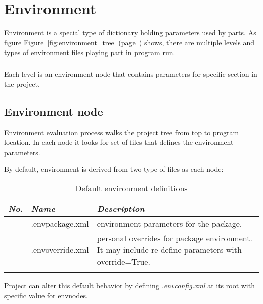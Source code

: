 \documentclass[design.tex]{subfiles}
\begin{document}
\chapter{Environment}
Environment is a special type of dictionary holding parameters used by parts. As figure Figure~\ref{fig:environment_tree} (page~\pageref{fig:environment_tree}) shows, there are multiple levels and types of environment files playing part in program run.
\paragraph{}
Each level is an environment node that contains parameters for specific section in the project.

\section{Environment node}
Environment evaluation process walks the project tree from top to program location. In each node it looks for set of files that defines the environment parameters.

By default, environment is derived from two type of files as each node:


\setcounter{tablerownumbers}{0}
\begin{longtable}{|r|l|p{7cm}|}
	\hline
	\emph{No.} & \emph{Name} & \emph{Description} \\ \hline
	\rownumber & .envpackage.xml \index{environ!envpackage}& environment parameters for the package. \\ \hline
	\rownumber & .envoverride.xml \index{environ!envoverride}& personal overrides for package environment. It may include re-define parameters with override=True. \\ \hline
	\caption{Default environment definitions}
	\label{table:environ-defaults}
\end{longtable}

Project can alter this default behavior by defining \emph{.envconfig.xml} at its root with specific value for envnodes.
\end{document}
